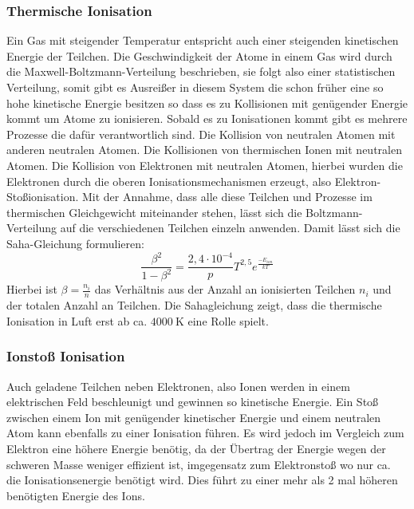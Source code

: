 \subsubsection{Thermische Ionisation}
\label{sec:thermion}
Ein Gas mit steigender Temperatur entspricht auch einer steigenden kinetischen Energie der Teilchen. Die Geschwindigkeit der Atome in einem Gas wird durch die Maxwell-Boltzmann-Verteilung beschrieben, sie folgt also einer statistischen Verteilung, somit gibt es Ausreißer in diesem System die schon früher eine so hohe kinetische Energie besitzen so dass es zu Kollisionen mit genügender Energie kommt um Atome zu ionisieren. Sobald es zu Ionisationen kommt gibt es mehrere Prozesse die dafür verantwortlich sind. Die Kollision von neutralen Atomen mit anderen neutralen Atomen. Die Kollisionen von thermischen Ionen mit neutralen Atomen. Die Kollision von Elektronen mit neutralen Atomen, hierbei wurden die Elektronen durch die oberen Ionisationsmechanismen erzeugt, also Elektron-Stoßionisation. Mit der Annahme, dass alle diese Teilchen und Prozesse im thermischen Gleichgewicht miteinander stehen, lässt sich die Boltzmann-Verteilung auf die verschiedenen Teilchen einzeln anwenden. Damit lässt sich die Saha-Gleichung formulieren:
\begin{equation}
    \frac{\beta^2}{1 - \beta^2} = \frac{2,4 \cdot 10^{-4}}{p}T^{2,5}e^{\frac{-E_{ion}}{kT}}
    \label{eq:saha}
\end{equation}
Hierbei ist \(\beta = \frac{n_i}{n}\) das Verhältnis aus der Anzahl an ionisierten Teilchen \(n_i\) und der totalen Anzahl an Teilchen. Die Sahagleichung zeigt, dass die thermische Ionisation in Luft erst ab ca. \(\SI{4000}{\kelvin}\) eine Rolle spielt. \cite{kuffel2000}

\subsubsection{Ionstoß Ionisation}
Auch geladene Teilchen neben Elektronen, also Ionen werden in einem elektrischen Feld beschleunigt und gewinnen so kinetische Energie. Ein Stoß zwischen einem Ion mit genügender kinetischer Energie und einem neutralen Atom kann ebenfalls zu einer Ionisation führen. Es wird jedoch im Vergleich zum Elektron eine höhere Energie benötig, da der Übertrag der Energie wegen der schweren Masse weniger effizient ist, imgegensatz zum Elektronstoß wo nur ca. die Ionisationsenergie benötigt wird. Dies führt zu einer mehr als 2 mal höheren benötigten Energie des Ions.

